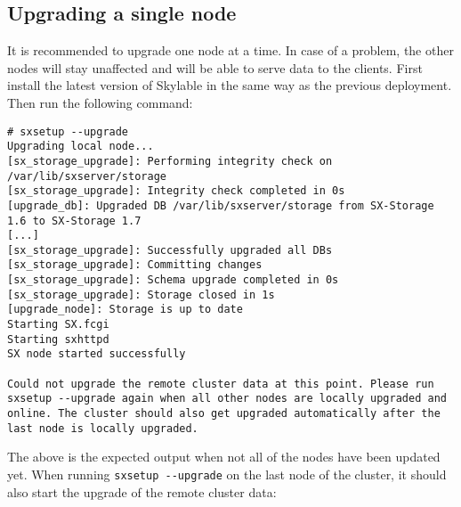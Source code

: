 \subsection{Upgrading a single node}
It is recommended to upgrade one node at a time. In case of a problem, the
other nodes will stay unaffected and will be able to serve data to the
clients.
First install the latest version of Skylable \SX in the same way as the
previous deployment. Then run the following command:
\begin{lstlisting}
# sxsetup --upgrade
Upgrading local node...
[sx_storage_upgrade]: Performing integrity check on /var/lib/sxserver/storage
[sx_storage_upgrade]: Integrity check completed in 0s
[upgrade_db]: Upgraded DB /var/lib/sxserver/storage from SX-Storage 1.6 to SX-Storage 1.7
[...]
[sx_storage_upgrade]: Successfully upgraded all DBs
[sx_storage_upgrade]: Committing changes
[sx_storage_upgrade]: Schema upgrade completed in 0s
[sx_storage_upgrade]: Storage closed in 1s
[upgrade_node]: Storage is up to date
Starting SX.fcgi
Starting sxhttpd
SX node started successfully

Could not upgrade the remote cluster data at this point. Please run
sxsetup --upgrade again when all other nodes are locally upgraded and
online. The cluster should also get upgraded automatically after the
last node is locally upgraded.
\end{lstlisting}
The above is the expected output when not all of the nodes have been
updated yet. When running \verb+sxsetup --upgrade+ on the last node
of the cluster, it should also start the upgrade of the remote cluster
data:
